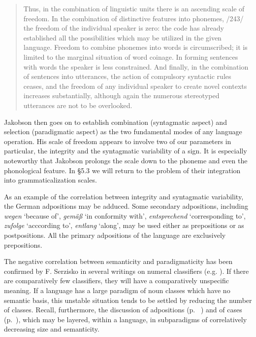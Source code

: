 \begin{quote}
Thus, in the combination of linguistic units there is an ascending scale of freedom. In the combination of distinctive features into phonemes, /243/ the freedom of the individual speaker is zero: the code has already established all the possibilities which may be utilized in the given language. Freedom to combine phonemes into words is circumscribed; it is limited to the marginal situation of word coinage. In forming sentences with words the speaker is less constrained. And finally, in the combination of sentences into utterances, the action of compulsory syntactic rules ceases, and the freedom of any individual speaker to create novel contexts increases substantially, although again the numerous stereotyped utterances are not to be overlooked.
\end{quote}

\noindent Jakobson then goes on to establish combination (syntagmatic aspect) and selection (paradigmatic aspect) as the two fundamental modes of any language operation. His scale of freedom appears to involve two of our parameters in particular, the integrity and the syntagmatic variability of a sign. It is especially noteworthy that Jakobson prolongs the scale down to the phoneme and even the phonological feature. In §5.3 we will return to the problem of their integration into grammaticalization scales.

As an example of the correlation between integrity and syntagmatic variability, the German adpositions may be adduced. Some secondary adpositions, including \textit{wegen} ‘because of’, \textit{gemäß} ‘in conformity with’, \textit{entsprechend} ‘corresponding to’, \textit{zufolge} ‘acccording to’, \textit{entlang} ‘along’, may be used either as prepositions or as postpositions. All the primary adpositions of the language are exclusively prepositions.

The negative correlation between semanticity and paradigmaticity has been confirmed by F. Serzisko in several writings on numeral classifiers (e.g. \citeyear[23f]{Serzisko1980}). If there are comparatively few classifiers, they will have a comparatively unspecific meaning. If a language has a large paradigm of noun classes which have no semantic basis, this unstable situation tends to be settled by reducing the number of classes. Recall, furthermore, the discussion of adpositions (p.~\pageref{page102}\chk%
) and of cases (p.~\pageref{page120}), which may be layered, within a language, in subparadigms of correlatively decreasing size and semanticity.

